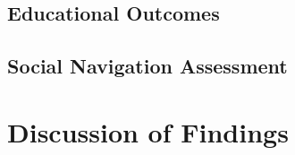 \subsection{Educational Outcomes}


\subsection{Social Navigation Assessment}




\section{Discussion of Findings}